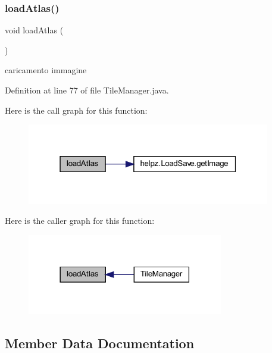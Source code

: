 \subsubsection{\texorpdfstring{load\+Atlas()}{loadAtlas()}}
{\footnotesize\ttfamily void load\+Atlas (\begin{DoxyParamCaption}{ }\end{DoxyParamCaption})\hspace{0.3cm}{\ttfamily [private]}}



caricamento immagine 



Definition at line 77 of file Tile\+Manager.\+java.

Here is the call graph for this function\+:
\nopagebreak
\begin{figure}[H]
\begin{center}
\leavevmode
\includegraphics[width=301pt]{classmanagers_1_1_tile_manager_afc6b9f4a25216ec36baa6e7518a7501a_cgraph}
\end{center}
\end{figure}
Here is the caller graph for this function\+:
\nopagebreak
\begin{figure}[H]
\begin{center}
\leavevmode
\includegraphics[width=242pt]{classmanagers_1_1_tile_manager_afc6b9f4a25216ec36baa6e7518a7501a_icgraph}
\end{center}
\end{figure}


\subsection{Member Data Documentation}
\mbox{\label{classmanagers_1_1_tile_manager_a0f6db27994c397bfb9bb56d539707c02}} 
